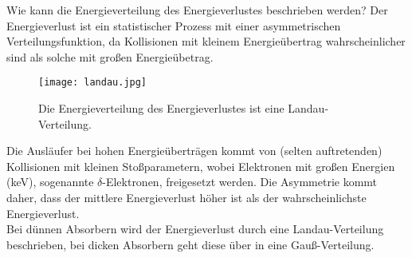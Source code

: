 Wie kann die Energieverteilung des Energieverlustes beschrieben werden? Der Energieverlust ist ein
statistischer Prozess mit einer asymmetrischen Verteilungsfunktion, da Kollisionen mit kleinem
Energieübertrag wahrscheinlicher sind als solche mit großen Energieübetrag.

\begin{figure}[H]
	\centering
	\texttt{[image: landau.jpg]}
	\caption{Die Energieverteilung des Energieverlustes ist eine Landau-Verteilung.}
	\label{}
\end{figure}

Die Ausläufer bei hohen Energieüberträgen kommt von (selten auftretenden) Kollisionen mit kleinen
Stoßparametern, wobei Elektronen mit großen Energien (keV), sogenannte $\delta$-Elektronen,
freigesetzt werden. Die Asymmetrie kommt daher, dass der mittlere Energieverlust höher
ist als der wahrscheinlichste Energieverlust.
\\
Bei dünnen Absorbern wird der Energieverlust durch eine Landau-Verteilung beschrieben, bei dicken
Absorbern geht diese über in eine Gauß-Verteilung.
